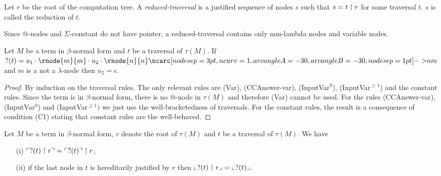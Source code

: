 

\begin{dfn}
Let $r$ be the root of the computation tree. A \emph{reduced-traversal} is a justified sequence of nodes $s$ such that
$s = t \upharpoonright r$ for some traversal $t$. $s$ is called the reduction of $t$.
\end{dfn}

Since $@$-nodes and $\Sigma$-constant do not have pointer, a reduced-traversal contains only
non-lambda nodes and variable nodes.


\begin{lem}
\label{lem:var_followedby_child}
Let $M$ be a term in $\beta$-normal form and $t$ be a traversal of $\tau(M)$.
If $?(t) = u_1 \cdot \rnode{m}{m} \cdot u_2 \cdot \rnode{n}{n} \bkptra[nodesep=1pt]{30}{n}{m}$ and $m$ is a not a $\lambda$-node then $u_2 = \epsilon$.
\end{lem}
\begin{proof}
By induction on the traversal rules. The only relevant rules are (Var), (CCAnswer-var), (InputVar$^0$), (InputVar$^{\geq 1}$)
and the constant rules.
Since the term is in $\beta$-normal form, there is no $@$-node in $\tau(M)$ and therefore (Var) cannot be used.
For the rules (CCAnswer-var), (InputVar$^0$) and (InputVar$^{\geq 1})$ we just use the well-bracketedness of traversals.
For the constant rules, the result is a consequence of condition (C1) stating that constant rules are the well-behaved.
\end{proof}

\begin{lem}
\label{lem:redtrav_trav} Let $M$ be a term in $\beta$-normal form,
$r$ denote the root of $\tau(M)$ and $t$ be a traversal of $\tau(M)$. We have
\begin{itemize}
\item[(i)] $ \ulcorner ?(t) \upharpoonright  r  \urcorner = \ulcorner ?(t) \urcorner \upharpoonright r$;
\item[(ii)] if the last node in $t$ is hereditarily justified by $r$ then $ \llcorner ?(t) \upharpoonright r  \lrcorner = \llcorner ?(t) \lrcorner$.
\end{itemize}
\end{lem}

